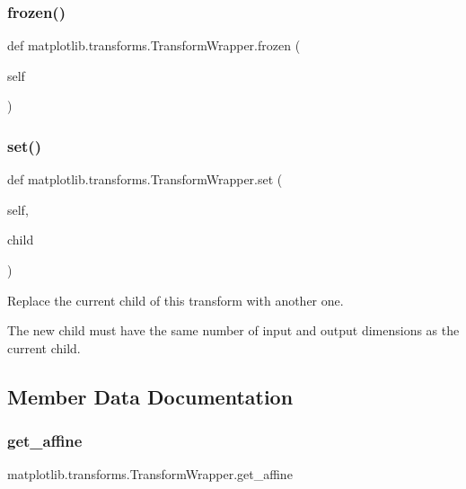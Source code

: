\subsubsection{\texorpdfstring{frozen()}{frozen()}}
{\footnotesize\ttfamily def matplotlib.\+transforms.\+Transform\+Wrapper.\+frozen (\begin{DoxyParamCaption}\item[{}]{self }\end{DoxyParamCaption})}

\mbox{\label{classmatplotlib_1_1transforms_1_1TransformWrapper_a836772f0cb1a7f061db955939bf46941}} 
\subsubsection{\texorpdfstring{set()}{set()}}
{\footnotesize\ttfamily def matplotlib.\+transforms.\+Transform\+Wrapper.\+set (\begin{DoxyParamCaption}\item[{}]{self,  }\item[{}]{child }\end{DoxyParamCaption})}

\begin{DoxyVerb}Replace the current child of this transform with another one.

The new child must have the same number of input and output
dimensions as the current child.
\end{DoxyVerb}
 

\subsection{Member Data Documentation}
\mbox{\label{classmatplotlib_1_1transforms_1_1TransformWrapper_a148a87b6ecf446d5abee4507ef544dce}} 
\subsubsection{\texorpdfstring{get\+\_\+affine}{get\_affine}}
{\footnotesize\ttfamily matplotlib.\+transforms.\+Transform\+Wrapper.\+get\+\_\+affine}

